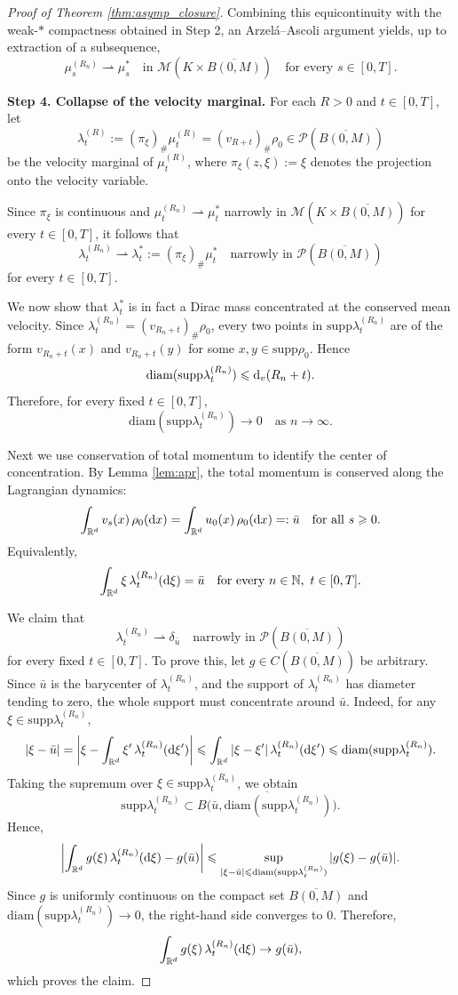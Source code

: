 \documentclass[10pt,reqno]{amsart}
\renewcommand{\ge}{\geqslant}
\renewcommand{\le}{\leqslant}
\numberwithin{equation}{section}
\newcommand{\R}{\mathbb R}
\newcommand{\N}{\mathbb N}
\newcommand{\lt}{\left}
\newcommand{\rt}{\right}
\newcommand{\intr}{\int_{\R^d}}
\newcommand{\calM}{\mathcal M}
\newcommand{\calP}{\mathcal P}
\newcommand{\rd}{\textnormal{d}}
\newcommand{\dx}{\textnormal{d}x}
\newcommand{\supp}{\text{supp}}
\newcommand{\diam}{\text{diam}}
\begin{document}
\begin{proof}[Proof of Theorem \ref{thm:asymp_closure}]
Combining this equicontinuity with the weak-$\ast$ compactness obtained in Step 2,
an Arzel\'a--Ascoli argument yields, up to extraction of a subsequence,
\[
\mu^{(R_n)}_s \rightharpoonup \mu^\ast_s
\quad\text{in }\calM(K\times\overline{B(0,M)})
\quad\text{for every } s\in[0,T].
\]

\medskip
\noindent\textbf{Step 4. Collapse of the velocity marginal.}
For each $R>0$ and $t\in[0,T]$, let
\[
\lambda^{(R)}_t := (\pi_\xi)_\#\mu^{(R)}_t = (v_{R+t})_\#\rho_0
\in \calP(\overline{B(0,M)})
\]
be the velocity marginal of $\mu^{(R)}_t$, where $\pi_\xi(z,\xi):=\xi$ denotes the projection onto the velocity variable.

Since $\pi_\xi$ is continuous and $\mu^{(R_n)}_t \rightharpoonup \mu^\ast_t$ narrowly in
$\calM(K\times\overline{B(0,M)})$ for every $t\in[0,T]$, it follows that
\[
\lambda^{(R_n)}_t \rightharpoonup \lambda^\ast_t := (\pi_\xi)_\#\mu^\ast_t
\quad\text{narrowly in }\calP(\overline{B(0,M)})
\]
for every $t\in[0,T]$.

We now show that $\lambda^\ast_t$ is in fact a Dirac mass concentrated at the conserved mean velocity. Since $\lambda^{(R_n)}_t=(v_{R_n+t})_\#\rho_0$, every two points in $\supp\lambda^{(R_n)}_t$
are of the form $v_{R_n+t}(x)$ and $v_{R_n+t}(y)$ for some $x,y\in\supp\rho_0$.
Hence
\[
\diam(\supp\lambda^{(R_n)}_t) \le \rd_v(R_n+t).
\]
Therefore, for every fixed $t\in[0,T]$,
\[
\diam(\supp\lambda^{(R_n)}_t)\to0 \quad\text{as }n\to\infty.
\]

Next we use conservation of total momentum to identify the center of concentration. By Lemma \ref{lem:apr}, 
the total momentum is conserved along the Lagrangian dynamics:
\[
\intr v_s(x)\,\rho_0(\dx)=\intr u_0(x)\,\rho_0(\dx)=:\bar u \quad\text{for all }s\ge0.
\]
Equivalently,
\[
\intr \xi\,\lambda^{(R_n)}_t(\rd\xi)=\bar u \quad\text{for every }n\in\N,\ t\in[0,T].
\]

We claim that
\[
\lambda^{(R_n)}_t \rightharpoonup \delta_{\bar u} \quad\text{narrowly in }\calP(\overline{B(0,M)})
\]
for every fixed $t\in[0,T]$.
To prove this, let $g\in C(\overline{B(0,M)})$ be arbitrary.
Since $\bar u$ is the barycenter of $\lambda^{(R_n)}_t$, and the support of $\lambda^{(R_n)}_t$
has diameter tending to zero, the whole support must concentrate around $\bar u$.
Indeed, for any $\xi\in\supp\lambda^{(R_n)}_t$,
\[
|\xi-\bar u|
=
\lt|\xi-\intr \xi'\,\lambda^{(R_n)}_t(\rd\xi')\rt|
\le
\intr |\xi-\xi'|\,\lambda^{(R_n)}_t(\rd\xi')
\le
\diam(\supp\lambda^{(R_n)}_t).
\]
Taking the supremum over $\xi\in\supp\lambda^{(R_n)}_t$, we obtain
\[
\supp\lambda^{(R_n)}_t \subset
\overline{B\bigl(\bar u,\diam(\supp\lambda^{(R_n)}_t)\bigr)}.
\]
Hence,
\[
\lt| \intr g(\xi)\,\lambda^{(R_n)}_t(\rd\xi)-g(\bar u) \rt|
\le
\sup_{|\xi-\bar u|\le \diam(\supp\lambda^{(R_n)}_t)}
|g(\xi)-g(\bar u)|.
\]
Since $g$ is uniformly continuous on the compact set $\overline{B(0,M)}$ and
$\diam(\supp\lambda^{(R_n)}_t)\to0$, the right-hand side converges to $0$.
Therefore,
\[
\intr g(\xi)\,\lambda^{(R_n)}_t(\rd\xi)\to g(\bar u),
\]
which proves the claim.


\end{proof}
\end{document}
